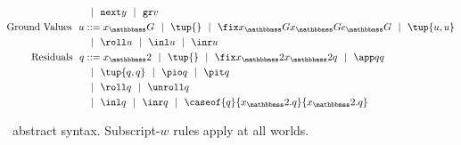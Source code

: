 \begin{figure}[t]
\begin{abstrsyn}
\[\begin{aligned}
&\gbar \next y
 \gbar \pure v \\
\text{Ground Values}\ \ 
u &::= \varG
 \gbar\tup{}
 \gbar \fix \varG \varG \exprG
 \gbar \tup{u, u} \\
&\gbar \roll u
 \gbar \inl u 
 \gbar \inr u \\
\text{Residuals}\ \ 
q &::= \varT
 \gbar \tup{}
 \gbar \fix \varT \varT q
 \gbar \app q q \\
&\gbar \tup{q, q} 
 \gbar \pio q 
 \gbar \pit q \\
&\gbar \roll q
 \gbar \unroll q\\
&\gbar \inl q 
 \gbar \inr q
 \gbar \caseof {q}{\varT.q}{\varT.q} \\
\end{aligned}\]
\end{abstrsyn}
\caption{\lang\ abstract syntax. Subscript-$w$ rules apply at all worlds.}
\label{fig:grammar}
\end{figure}
